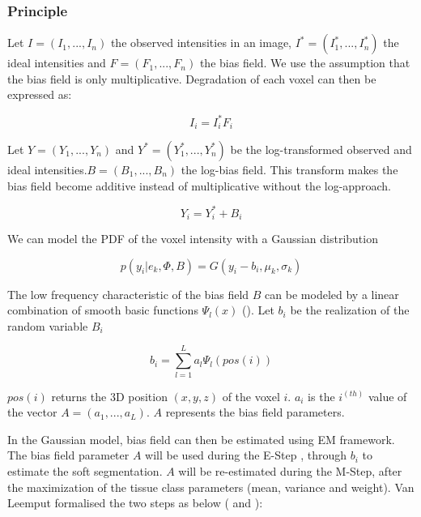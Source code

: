 \subsubsection{Principle}
Let $I=(I_1, ..., I_n)$ the observed intensities in an image, $I^*=(I_1^*, ..., I_n^*)$ the ideal intensities and $F=(F_1, ..., F_n)$ the bias field. We use the assumption that the bias field is only multiplicative. Degradation of each voxel can then be expressed as:

  \begin{equation*}
  I_i=I_i^*F_i
  \end{equation*}

Let $Y=(Y_1, ..., Y_n)$ and $Y^*=(Y_1^*, ..., Y_n^*)$ be the log-transformed observed and ideal intensities.$B=(B_1, ..., B_n)$ the log-bias field. This transform makes the bias field become additive instead of multiplicative without the log-approach.

  \begin{equation*}
  Y_i=Y_i^* + B_i
  \end{equation*}
  
We can model the PDF of the voxel intensity with a Gaussian distribution

 \begin{equation*}
  p(y_i|e_k, \Phi, B) = G(y_i-b_i,\mu_k,\sigma_k)
  \end{equation*}
  
The low frequency characteristic of the bias field $B$ can be modeled by a linear combination of smooth basic functions $\Psi_l(x)$ (\cite{13}). Let $b_i$ be the realization of the random variable $B_i$ 

  \begin{equation*}
  b_i = \sum_{l=1}^L a_l\Psi_l(pos(i))
  \end{equation*}
  
 $pos(i)$ returns the 3D position $(x,y,z)$ of the voxel $i$. $a_i$ is the $i^{(th)}$ value of the vector $A=(a_1, ..., a_L)$. $A$ represents the bias field parameters.
 \par
In the Gaussian model, bias field can then be estimated using EM framework. The bias field parameter $A$ will be used during the E-Step , through $b_i$ to estimate the soft segmentation. $A$ will be re-estimated during the M-Step, after the maximization of the tissue class parameters (mean, variance and weight).
Van Leemput formalised the two steps as below (\cite{8} and \cite{9}):\\

